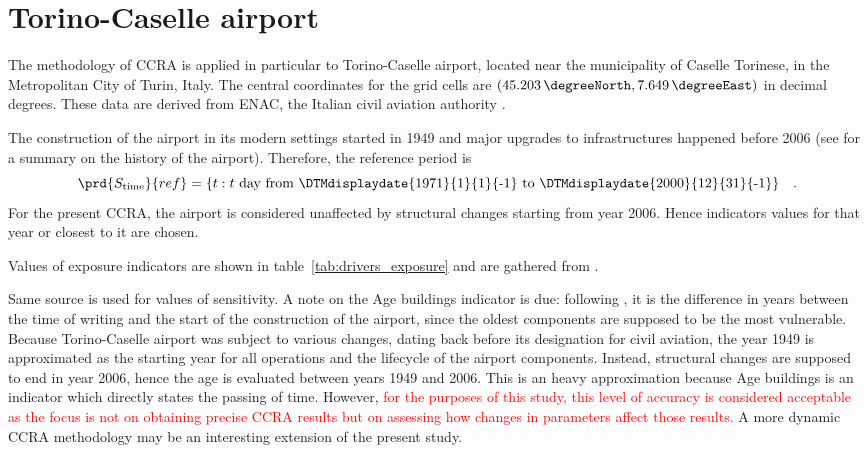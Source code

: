 \section{Torino-Caselle airport}
The methodology of \gls{CCRA} is applied in particular to Torino-Caselle airport, located near the municipality of Caselle Torinese, in the Metropolitan City of Turin, Italy.
The central coordinates for the grid cells are $(\qty{45.203}{\degreeNorth}, \qty{7.649}{\degreeEast})$ in decimal degrees. These data are derived from \gls{ENAC}, the Italian civil aviation authority \cite{2014ENACTorinoCaselle}.

The construction of the airport in its modern settings started in 1949 and major upgrades to infrastructures happened before 2006 (see \cite[18]{2015PudduCorporateSocial} for a summary on the history of the airport). Therefore, the reference period is
\begin{equation}
  \label{eq:period_reference_torino}
  \prd{S_\text{time}}{ref} = \{ t : \text{$t$ day from \DTMdisplaydate{1971}{1}{1}{-1} to \DTMdisplaydate{2000}{12}{31}{-1}} \}
  \quad .
\end{equation}
For the present \gls{CCRA}, the airport is considered unaffected by structural changes starting from year 2006. Hence \glspl{indicator} values for that year or closest to it are chosen.

Values of \gls{exposure} indicators are shown in table~\ref{tab:drivers_exposure} and are gathered from \cite[154-179]{2010OneWorksAtlanteDegli}.

Same source is used for values of \gls{sensitivity}. A note on the {Age buildings} indicator is due: following \cite[5]{2022DeVivoRiskAssessment}, it is the difference in years between the time of writing and the start of the construction of the airport, since the oldest components are supposed to be the most vulnerable. Because Torino-Caselle airport was subject to various changes, dating back before its designation for civil aviation, the year 1949 is approximated as the starting year for all operations and the lifecycle of the airport components. Instead, structural changes are supposed to end in year 2006, hence the age is evaluated between years 1949 and 2006. This is an heavy approximation because {Age buildings} is an indicator which directly states the passing of time. However, \textcolor{red}{for the purposes of this study, this level of accuracy is considered acceptable as the focus is not on obtaining precise \gls{CCRA} results but on assessing how changes in parameters affect those results.} 
A more dynamic \gls{CCRA} methodology may be an interesting extension of the present study.

